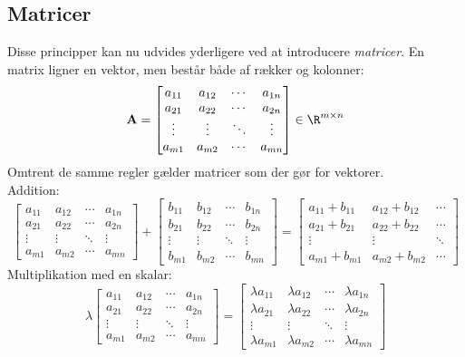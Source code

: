 \documentclass[../SOP.tex]{subfile}
\begin{document}
\subsection{Matricer}
Disse principper kan nu udvides yderligere ved at introducere \emph{matricer}. En matrix ligner en vektor, men består både af rækker og kolonner:
\begin{equation*}
  \mathbf{A}=\begin{bmatrix}
    a_{11} & a_{12} & \cdots & a_{1n} \\
    a_{21} & a_{22} & \cdots & a_{2n} \\
    \vdots & \vdots & \ddots & \vdots \\
    a_{m1} & a_{m2} & \cdots & a_{mn}
  \end{bmatrix}
  \in \R^{m\times n}
\end{equation*}
Omtrent de samme regler gælder matricer som der gør for vektorer.\\
Addition:
\begin{equation*}
  \begin{bmatrix}
    a_{11} & a_{12} & \cdots & a_{1n} \\
    a_{21} & a_{22} & \cdots & a_{2n} \\
    \vdots & \vdots & \ddots & \vdots \\
    a_{m1} & a_{m2} & \cdots & a_{mn}
  \end{bmatrix}
  +
  \begin{bmatrix}
    b_{11} & b_{12} & \cdots & b_{1n} \\
    b_{21} & b_{22} & \cdots & b_{2n} \\
    \vdots & \vdots & \ddots & \vdots \\
    b_{m1} & b_{m2} & \cdots & b_{mn}
  \end{bmatrix}
  =
  \begin{bmatrix}
    a_{11} + b_{11} & a_{12} + b_{12} & \cdots \\
    a_{21} + b_{21} & a_{22} + b_{22} & \cdots \\
    \vdots & \vdots & \ddots \\
    a_{m1} + b_{m1} & a_{m2} + b_{m2} & \cdots 
  \end{bmatrix}
\end{equation*}
Multiplikation med en skalar:
\begin{equation*}
  \lambda
  \begin{bmatrix}
    a_{11} & a_{12} & \cdots & a_{1n} \\
    a_{21} & a_{22} & \cdots & a_{2n} \\
    \vdots & \vdots & \ddots & \vdots \\
    a_{m1} & a_{m2} & \cdots & a_{mn}
  \end{bmatrix}
  =
  \begin{bmatrix}
    \lambda a_{11} & \lambda a_{12} & \cdots & \lambda a_{1n} \\
    \lambda a_{21} & \lambda a_{22} & \cdots & \lambda a_{2n} \\
    \vdots & \vdots & \ddots & \vdots \\
    \lambda a_{m1} & \lambda a_{m2} & \cdots & \lambda a_{mn}
  \end{bmatrix}
\end{equation*}
\end{document}
